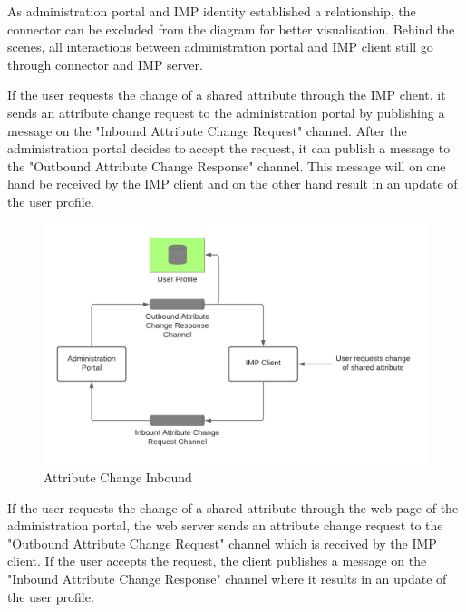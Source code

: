 As administration portal and IMP identity established a relationship, the connector can be excluded from the diagram for better visualisation. Behind the scenes, all interactions between administration portal and IMP client still go through connector and IMP server.

If the user requests the change of a shared attribute through the IMP client, it sends an attribute change request to the administration portal by publishing a message on the "Inbound Attribute Change Request" channel. After the administration portal decides to accept the request, it can publish a message to the "Outbound Attribute Change Response" channel. This message will on one hand be received by the IMP client and on the other hand result in an update of the user profile. 

\begin{figure}[h]
    \centering
    \caption{Attribute Change Inbound}
    \includegraphics[scale=0.3]{Diagrams/Integration Architecture 1/Overview/Attribute Change IMP Client.png}
\end{figure}

If the user requests the change of a shared attribute through the web page of the administration portal, the web server sends an attribute change request to the "Outbound Attribute Change Request" channel which is received by the IMP client. If the user accepts the request, the client publishes a message on the "Inbound Attribute Change Response" channel where it results in an update of the user profile.


